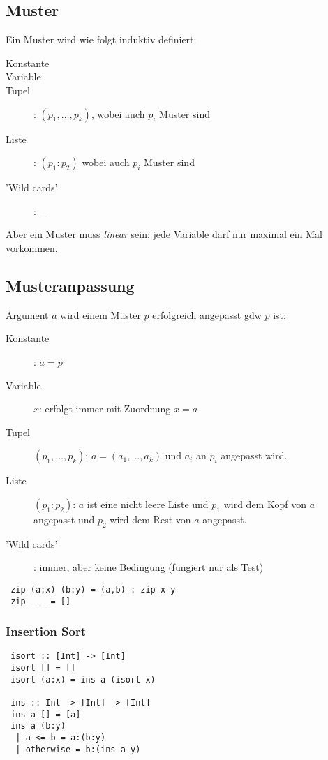 \documentclass[german,10pt, a4paper, twocolumn]{scrartcl}
\theoremstyle{definition}
\theoremstyle{remark}
\begin{document}
\subsection{Muster}

Ein Muster wird wie folgt induktiv definiert:
\begin{description}
	\item[Konstante]
	\item[Variable]
	\item[Tupel]: $(p_1,\ldots,p_k)$, wobei auch $p_i$ Muster sind
	\item[Liste]: $(p_1:p_2)$ wobei auch $p_i$ Muster sind
	\item['Wild cards']: \_
\end{description}

Aber ein Muster muss \textit{linear} sein: jede Variable darf nur maximal ein Mal vorkommen.

\subsection{Musteranpassung}

Argument $a$ wird einem Muster $p$ erfolgreich angepasst gdw $p$ ist:
\begin{description}
	\item[Konstante]: $a=p$
	\item[Variable] $x$: erfolgt immer mit Zuordnung $x=a$
	\item[Tupel] $(p_1,\ldots,p_k)$: $a=(a_1,\ldots,a_k)$ und $a_i$ an $p_i$ angepasst wird.
	\item[Liste] $(p_1:p_2)$: $a$ ist eine nicht leere Liste und $p_1$ wird dem Kopf von $a$ angepasst und $p_2$ wird dem Rest von $a$ angepasst.
	\item['Wild cards']: immer, aber keine Bedingung (fungiert nur als Test) 
\end{description}

\begin{verbatim}
 zip (a:x) (b:y) = (a,b) : zip x y
 zip _ _ = []
\end{verbatim}

\subsubsection{Insertion Sort}

\begin{verbatim}
 isort :: [Int] -> [Int]
 isort [] = []
 isort (a:x) = ins a (isort x)

 ins :: Int -> [Int] -> [Int]
 ins a [] = [a]
 ins a (b:y)
  | a <= b = a:(b:y)
  | otherwise = b:(ins a y)
\end{verbatim}
\end{document}
